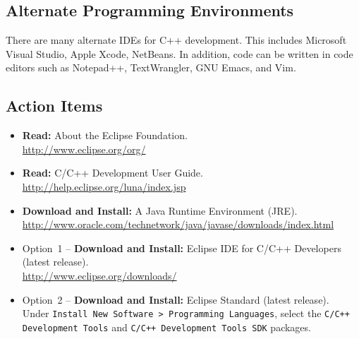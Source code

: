 \documentclass[11pt]{article}
\begin{document}
\subsection*{Alternate Programming Environments}

There are many alternate IDEs for C++ development.
This includes Microsoft Visual Studio, Apple Xcode, NetBeans.
In addition, code can be written in code editors such as Notepad++, TextWrangler, GNU Emacs, and Vim.

\subsection*{Action Items}

\begin{itemize}
\item \textbf{Read:} About the Eclipse Foundation. \\
\url{http://www.eclipse.org/org/}
\item \textbf{Read:} C/C++ Development User Guide. \\
\url{http://help.eclipse.org/luna/index.jsp}
\item \textbf{Download and Install:} A Java Runtime Environment (JRE). \\
\url{http://www.oracle.com/technetwork/java/javase/downloads/index.html}
\item Option~1 -- \textbf{Download and Install:} Eclipse IDE for C/C++ Developers (latest release). \\
\url{http://www.eclipse.org/downloads/}
\item Option~2 -- \textbf{Download and Install:} Eclipse Standard (latest release). \\
Under \texttt{Install New Software > Programming Languages}, select the \texttt{C/C++ Development Tools} and \texttt{C/C++ Development Tools SDK} packages.
\end{itemize}
\end{document}
